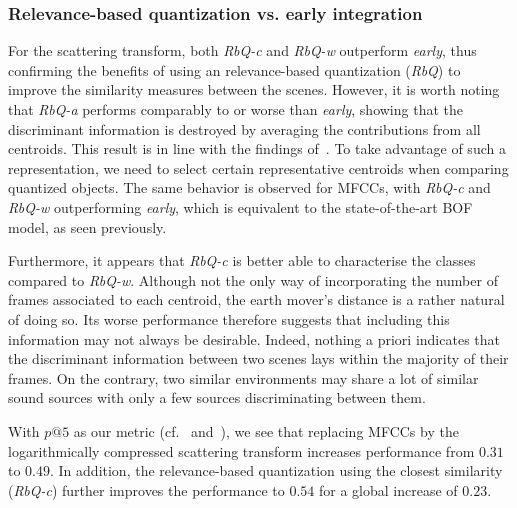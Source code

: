 \documentclass[smallextended]{svjour3}
\makeatletter
\newcommand*{\vs}{vs.\@\xspace}
\makeatother
\begin{document}
\subsubsection*{Relevance-based quantization \vs early integration}

For the scattering transform, both \emph{RbQ-c} and \emph{RbQ-w} outperform \emph{early}, thus confirming the benefits of using an relevance-based quantization (\emph{RbQ}) to improve the similarity measures between the scenes. However, it is worth noting that \emph{RbQ-a} performs comparably to or worse than \emph{early}, showing that the discriminant information is destroyed by averaging the contributions from all centroids. This result is in line with the findings of~\cite{lagrange:hal-01082501}. To take advantage of such a representation, we need to select certain representative centroids when comparing quantized objects. The same behavior is observed for MFCCs, with \emph{RbQ-c} and \emph{RbQ-w} outperforming \emph{early}, which is equivalent to the state-of-the-art BOF model, as seen previously.

Furthermore, it appears that \emph{RbQ-c} is better able to characterise the classes compared to \emph{RbQ-w}. Although not the only way of incorporating the number of frames associated to each centroid, the earth mover's distance is a rather natural of doing so. Its worse performance therefore suggests that including this information may not always be desirable. Indeed, nothing a priori indicates that the discriminant information between two scenes lays within the majority of their frames. On the contrary, two similar environments may share a lot of similar sound sources with only a few sources discriminating between them.

With $p@5$ as our metric (cf.~\cite{aucouturier2007bag} and~\cite{lagrange:hal-01082501}), we see that replacing MFCCs by the logarithmically compressed scattering transform increases performance from $0.31$ to $0.49$. In addition, the relevance-based quantization using the closest similarity (\emph{RbQ-c}) further improves the performance to $0.54$ for a global increase of $0.23$.
\end{document}
